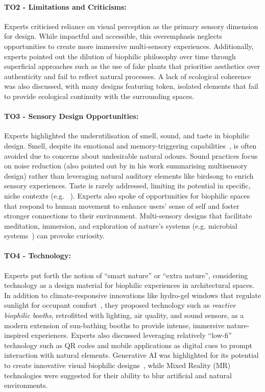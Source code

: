 \paragraph{TO2 - Limitations and Criticisms:} Experts criticised reliance on visual perception as the primary sensory dimension for design. While impactful and accessible, this overemphasis neglects opportunities to create more immersive multi-sensory experiences. Additionally, experts  pointed out the dilution of biophilic philosophy over time through superficial approaches such as the use of fake plants that prioritise aesthetics over authenticity and fail to reflect natural processes. A lack of ecological coherence was also discussed, with many designs featuring token, isolated elements that fail to provide ecological continuity with the surrounding spaces. 

\paragraph{TO3 - Sensory Design Opportunities:} Experts highlighted the underutilisation of smell, sound, and taste in biophilic design. Smell, despite its emotional and memory-triggering capabilities~\cite{henshaw2013urban}, is often avoided due to concerns about undesirable natural odours. Sound practices focus on noise reduction (also pointed out by \citet{spence2020senses} in his work summarising multisensory design) rather than leveraging natural auditory elements like birdsong to enrich sensory experiences. Taste is rarely addressed, limiting its potential in specific, niche contexts (e.g. ~\cite{horwitz2004eating}). Experts also spoke of opportunities for biophilic spaces that respond to human movement to enhance users' sense of self and foster stronger connections to their environment. Multi-sensory designs that facilitate meditation, immersion, and exploration of nature’s systems (e.g. microbial systems~\cite{risseeuw2024re}) can provoke curiosity.

\paragraph{TO4 - Technology:}
Experts put forth the notion of ``smart nature'' or ``extra nature'', considering technology as a design material for biophilic experiences in architectural spaces. In addition to climate-responsive innovations like hydro-gel windows that regulate sunlight for occupant comfort~\cite{zhou2020liquid}, they proposed technology such as \emph{reactive biophilic booths}, retrofitted with lighting, air quality, and sound sensors, as a modern extension of sun-bathing booths to provide intense, immersive nature-inspired experiences. Experts also discussed leveraging relatively ``low-fi'' technology such as QR codes and mobile applications as digital cues to prompt interaction with natural elements. Generative AI was highlighted for its potential to create innovative visual biophilic designs~\cite{sabinson2023walk, xing2024exploring}, while Mixed Reality (MR) technologies were suggested for their ability to blur artificial and natural environments.

